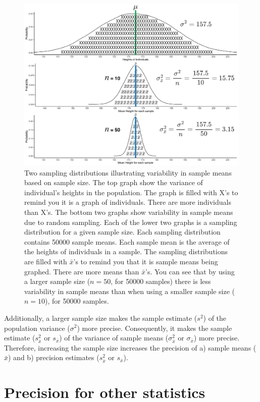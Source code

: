 \documentclass[
]{krantz}
\begin{document}
\begin{figure}
\includegraphics[width=0.8\linewidth]{ch_samples_precision/images/sampling_mdist} \caption[Two sampling distributions illustrating variability in sample means based on sample size]{Two sampling distributions illustrating variability in sample means based on sample size. The top graph show the variance of individual's heights in the population. The graph is filled with X's to remind you it is a graph of individuals. There are more individuals than X's. The bottom two graphs show variability in sample means due to random sampling. Each of the lower two graphs is a sampling distribution for a given sample size. Each sampling distribution contains 50000 sample means. Each sample mean is the average of the heights of individuals in a sample. The sampling distributions are filled with $\bar{x}$'s to remind you that it is sample means being graphed. There are more means than $\bar{x}$'s. You can see that by using a larger sample size ($n = 50$, for 50000 samples) there is less variability in sample means than when using a smaller sample size ($n = 10$), for 50000 samples.}\label{fig:threedist}
\end{figure}

Additionally, a larger sample size makes the sample estimate (\(s^2\)) of the population variance (\(\sigma^2\)) more precise. Consequently, it makes the sample estimate (\(s_{\bar{x}}^2\) or \(s_{\bar{x}}\)) of the variance of sample means (\(\sigma_{\bar{x}}^2\) or \(\sigma_{\bar{x}}\)) more precise. Therefore, increasing the sample size increases the precision of a) sample means (\(\bar{x}\)) and b) precision estimates (\(s_{\bar{x}}^2\) or \(s_{\bar{x}}\)).

\newpage

\hypertarget{precision-for-other-statistics}{%
\section{Precision for other statistics}\label{precision-for-other-statistics}}
\end{document}
